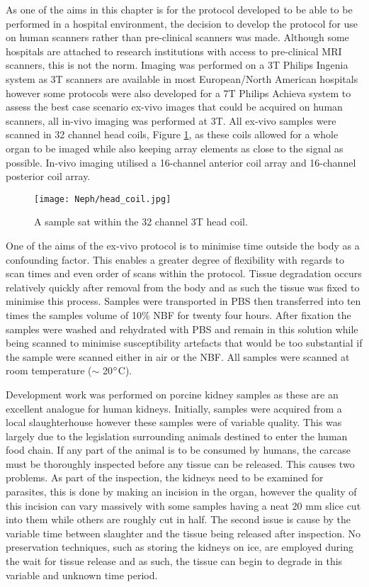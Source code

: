 As one of the aims in this chapter is for the protocol developed to be able to be performed in a hospital environment, the decision to develop the protocol for use on human scanners rather than pre-clinical scanners was made. Although some hospitals are attached to research institutions with access to pre-clinical \ac{MRI} scanners, this is not the norm. Imaging was performed on a 3T Philips Ingenia system as 3T scanners are available in most European/North American hospitals however some protocols were also developed for a 7T Philips Achieva system to assess the best case scenario ex-vivo images that could be acquired on human scanners, all in-vivo imaging was performed at 3T. All ex-vivo samples were scanned in 32 channel head coils, Figure \ref{fig:ex_head_coil}, as these coils allowed for a whole organ to be imaged while also keeping array elements as close to the signal as possible. In-vivo imaging utilised a 16-channel anterior coil array and 16-channel posterior coil array.

\begin{figure}[H]
	\centering
	\texttt{[image: Neph/head\_coil.jpg]}
	\caption{A sample sat within the 32 channel 3T head coil.}
	\label{fig:ex_head_coil}	
\end{figure}

One of the aims of the ex-vivo protocol is to minimise time outside the body as a confounding factor. This enables a greater degree of flexibility with regards to scan times and even order of scans within the protocol. Tissue degradation occurs relatively quickly after removal from the body and as such the tissue was fixed to minimise this process. Samples were transported in \acf{PBS} then transferred into ten times the samples volume of 10\% \acf{NBF} for twenty four hours. After fixation the samples were washed and rehydrated with \ac{PBS} and remain in this solution while being scanned to minimise susceptibility artefacts that would be too substantial if the sample were scanned either in air or the \ac{NBF}. All samples were scanned at room temperature ($\sim$ 20$\degree$C).

Development work was performed on porcine kidney samples as these are an excellent analogue for human kidneys. Initially, samples were acquired from a local slaughterhouse however these samples were of variable quality. This was largely due to the legislation surrounding animals destined to enter the human food chain. If any part of the animal is to be consumed by humans, the carcase must be thoroughly inspected before any tissue can be released. This causes two problems. As part of the inspection, the kidneys need to be examined for parasites, this is done by making an incision in the organ, however the quality of this incision can vary massively with some samples having a neat 20 mm slice cut into them while others are roughly cut in half. The second issue is cause by the variable time between slaughter and the tissue being released after inspection. No preservation techniques, such as storing the kidneys on ice, are employed during the wait for tissue release and as such, the tissue can begin to degrade in this variable and unknown time period.

